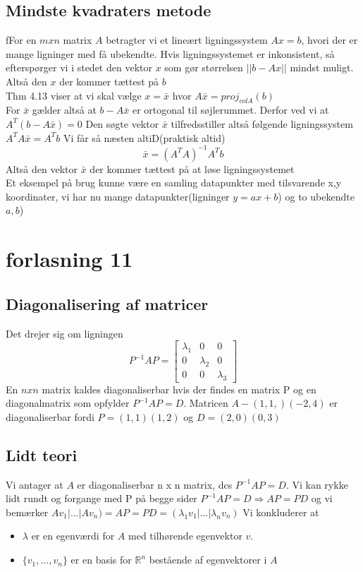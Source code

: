 \documentclass[a4paper,fleqn]{report}
\newcommand{\RR}{\mathbb{R}}
\begin{document}
	\section{Mindste kvadraters metode}
	fFor en $mxn$ matrix $A$ betragter vi et lineært ligningssystem $Ax = b$, hvori der
	er mange ligninger med få ubekendte. Hvis ligningssystemet er inkonsistent, så efterspørger
	vi i stedet den vektor $x$ som gør størrelsen $||b-Ax||$ mindst muligt. Altså den $x$ der
	kommer tættest på $b$\\
	Thm 4.13 viser at vi skal vælge $x = \bar{x}$ hvor $A\bar{x} = proj_{col A}(b)$\\
	For $\bar{x}$ gælder altså at $b-A\bar{x}$ er ortogonal til søjlerummet. Derfor ved vi at
	$A^T(b-A\bar{x}) = 0$ Den søgte vektor $\bar{x}$ tilfredsstiller altså følgende ligningssystem
	$A^TA\bar{x} = A^Tb$
	Vi får så næsten altiD(praktisk altid)
	\[ \bar{x} = (A^TA)^{-1}A^Tb \] Altså den vektor $\bar{x}$ der kommer tættest på at løse
	ligningssystemet\\

	Et eksempel på brug kunne være en samling datapunkter med tilsvarende x,y koordinater, 
	vi har nu mange datapunkter(ligninger $y = ax+b$) og to ubekendte $a,b$)

	\chapter{forlasning 11}
	\section{Diagonalisering af matricer}
	Det drejer sig om ligningen \[P^{-1}AP = \begin{bmatrix}\lambda_1&0&0\\0&\lambda_2&0\\0&0&\lambda_3\end{bmatrix}\]
	En $n x n$ matrix kaldes diagonaliserbar hvis der findes en matrix P og en diagonalmatrix som opfylder
	$P^{-1}AP = D$.
	Matricen $A - (1,1,)(-2,4)$ er diagonaliserbar fordi $P = (1,1)(1,2)$ og $D = (2,0)(0,3)$\\

	\section{Lidt teori}
	Vi antager at $A$ er diagonaliserbar n x n matrix, dcs $P^{-1}AP=D$. Vi kan rykke lidt
	rundt og forgange med P på begge sider $P^{-1}AP = D \Rightarrow AP=PD$ og vi bemærker
	$Av_1 | \dots | Av_n) = AP = PD = (\lambda_1v_1|\dots|\lambda_nv_n)$
	Vi konkluderer at 
	\begin{itemize}
		\item $\lambda$ er en egenværdi for $A$ med tilhørende egenvektor $v$.
		\item $\{v_1, \dots, v_n\}$ er en basis for $\RR^n$ bestående af egenvektorer i $A$
	\end{itemize}
	
\end{document}
